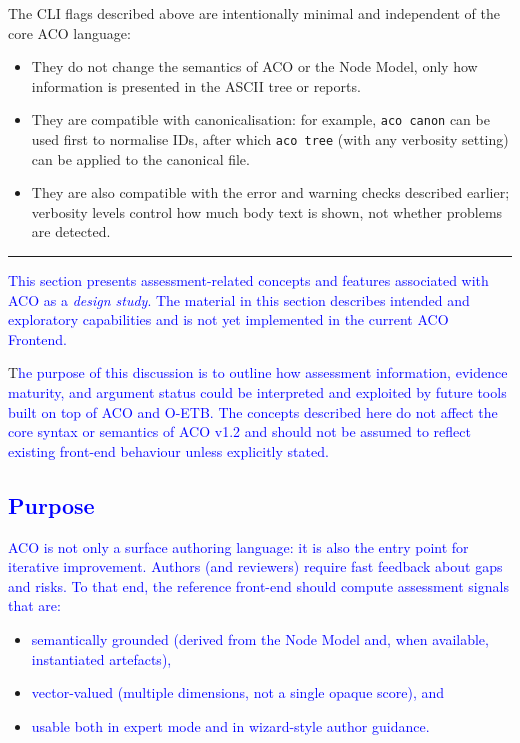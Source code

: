 \documentclass[11pt]{article}
\begin{document}
The CLI flags described above are intentionally minimal and independent of the core ACO language:

\begin{itemize}[leftmargin=2em]
  \item They do not change the semantics of ACO or the Node Model, only how information is presented in the ASCII tree or reports.
  \item They are compatible with canonicalisation: for example, \texttt{aco canon} can be used first to normalise IDs, after which \texttt{aco tree} (with any verbosity setting) can be applied to the canonical file.
  \item They are also compatible with the error and warning checks described earlier; verbosity levels control how much body text is shown, not whether problems are detected.
\end{itemize}

\bigskip
\hrule
\bigskip

\textcolor{blue}{This section presents assessment-related concepts and features associated with ACO
as a \emph{design study}. The material in this section describes intended and
exploratory capabilities and is not yet implemented in the current ACO Frontend.}

T\textcolor{blue}{he purpose of this discussion is to outline how assessment information, evidence
maturity, and argument status could be interpreted and exploited by future tools
built on top of ACO and O-ETB. The concepts described here do not affect the core
syntax or semantics of ACO v1.2 and should not be assumed to reflect existing
front-end behaviour unless explicitly stated.}

\subsection{\textcolor{blue}{Purpose}}

\textcolor{blue}{ACO is not only a surface authoring language: it is also the entry point for iterative improvement. Authors (and reviewers) require fast feedback about gaps and risks. To that end, the reference front-end should compute assessment signals that are:}
\begin{itemize}[leftmargin=2em]
  \item \textcolor{blue}{semantically grounded (derived from the Node Model and, when available, instantiated artefacts),}
  \item \textcolor{blue}{vector-valued (multiple dimensions, not a single opaque score), and}
  \item \textcolor{blue}{usable both in expert mode and in wizard-style author guidance.}
\end{itemize}
\end{document}
